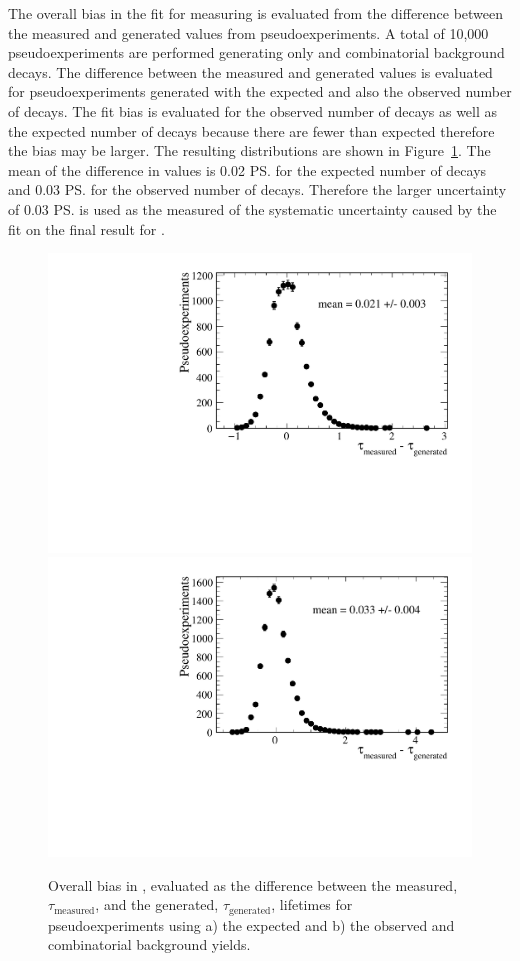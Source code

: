 The overall bias in the fit for measuring \tmumu is evaluated from the difference between the measured and generated values from pseudoexperiments. A total of 10,000 pseudoexperiments are performed generating only \bsmumu and combinatorial background decays. %
The difference between the measured and generated \tmumu values is evaluated for pseudoexperiments generated with the expected and also the observed number of \bsmumu decays. The fit bias is evaluated for the observed number of decays as well as the expected number of decays because there are fewer than expected therefore the bias may be larger. The resulting distributions are shown in Figure~\ref{fig:BsmumuYieldPulls}. The mean of the difference in \tmumu values is 0.02 \ps for the expected number of decays and 0.03 \ps for the observed number of decays. Therefore the larger uncertainty of 0.03 \ps is used as the measured of the systematic uncertainty caused by the fit on the final result for \tmumu. %

\begin{figure}[tbp]
    \centering
        \includegraphics[width=0.49 \textwidth]{./Figs/LifetimeSystematics/tau_meas-tau_gen_expected.pdf}
        \includegraphics[width=0.49 \textwidth]{./Figs/LifetimeSystematics/tau_meas_tau_gen_observed.pdf}
    \caption{Overall bias in \tmumu, evaluated as the difference between the measured, $\tau_\mathrm{{measured}}$, and the generated, $\tau_{\mathrm{generated}}$, lifetimes for pseudoexperiments using a) the expected and b) the observed  \bsmumu and combinatorial background yields.}
    \label{fig:BsmumuYieldPulls}
\end{figure}


